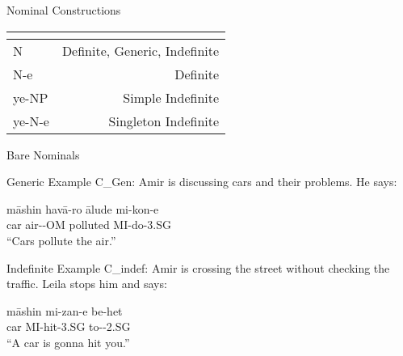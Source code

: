 \documentclass[10pt]{beamer}
\begin{document}
\begin {frame} {Nominal Constructions}

\begin {tabular}{l | r}
\multicolumn{2}{c}{} \\\hline
\alert{\hspace{0.44cm}N} & \alert{Definite, Generic, Indefinite}\\ \hline
\hspace{0.44cm}N-{\color {red}e} & Definite \\ \hline
{\color {ggreen}ye}-NP & Simple Indefinite\\ \hline
{\color {ggreen}ye}-N-{\color {red}e} & Singleton Indefinite\\ \hline
\end {tabular}

\end {frame}

\begin {frame} {Bare Nominals}

\begin {exampleblock} {Generic Example}
{\small C_{Gen}: Amir is discussing cars and their problems. He says:}
	\begin {exe}
		\ex \label{bache} \gll	m\={a}shin	hav\={a}-ro	\={a}lude	mi-kon-e\\
			car	air-{\scriptsize -OM}	polluted	{\scriptsize MI-}do{\scriptsize -3.SG}\\
			``Cars pollute the air.''\\
	\end {exe}
\end {exampleblock}

\pause

\begin {exampleblock} {Indefinite Example}
{\small C_{indef}: Amir is crossing the street without checking the traffic. Leila stops him and says: }
	\begin {exe}
		\ex \label{} \gll	m\={a}shin	mi-zan-e be-het\\
			car	{\scriptsize MI-}hit{\scriptsize -3.SG} to-{\scriptsize -2.SG}\\
			``A car is gonna hit you.''\\
	\end {exe}

\end {exampleblock}

\end {frame}
\end{document}
